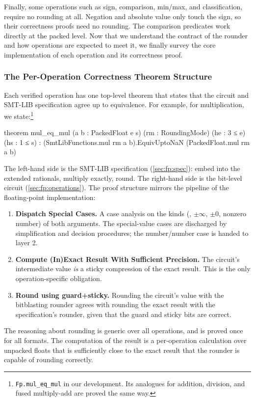 Finally, some operations such as sign, comparison, min/max, and classification, require no rounding at all.
Negation and absolute value only touch the sign, so their correctness proofs need no rounding.
The comparison predicates work directly at the packed level.
Now that we understand the contract of the rounder and how operations are expected to meet it,
we finally survey the core implementation of each operation and its correctness proof.

\subsubsection{The Per-Operation Correctness Theorem Structure}\label{sec:fp:operation-proofs}

Each verified operation has one top-level theorem that states that the circuit and SMT-LIB specification agree up to \nan{} equivalence.
For example, for multiplication, we state:\footnote{%
\texttt{Fp.mul\_eq\_mul} in our development.
Its analogues for addition, division, and fused multiply-add are proved
the same way.}
\begin{lean4}
theorem mul_eq_mul (a b : PackedFloat e s) (rm : RoundingMode)
    (he : 3 ≤ e) (hs : 1 ≤ s) :
  (SmtLibFunctions.mul rm a b).EquivUptoNaN (PackedFloat.mul rm a b)
\end{lean4}
\noindent The left-hand side is the SMT-LIB specification (\cref{sec:fp:spec}):
embed into the extended rationals, multiply exactly, round.
The right-hand side is the bit-level circuit (\cref{sec:fp:operations}).
The proof structure mirrors the pipeline of the floating-point implementation:

\begin{enumerate}
\item \textbf{Dispatch Special Cases.} A case analysis on the kinds
  (\nan{}, $\pm\infty$, $\pm 0$, nonzero number) of both arguments.
  The special-value cases are discharged by simplification and decision procedures;
  the number/number case is handed to layer 2.
\item \textbf{Compute (In)Exact Result With Sufficient Precision.}
  The circuit's intermediate value \emph{is} a sticky compression of the exact
  result. This is the only operation-specific obligation.
\item \textbf{Round using guard+sticky.}
   Rounding the circuit's value with the bitblasting rounder agrees with rounding the exact result with the specification's rounder,
   given that the guard and sticky bits are correct.
\end{enumerate}
\noindent The reasoning about rounding is generic over all operations, and is proved once for all formats.
The computation of the result is a per-operation calculation over unpacked floats
that is sufficiently close to the exact result that the rounder is capable of rounding correctly.

